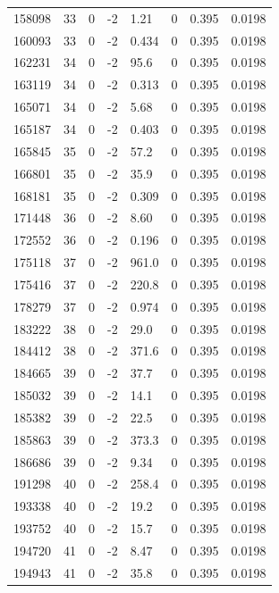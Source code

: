 \documentclass[preview]{standalone}
\begin{document}
{{{{{{{{\begin{tabular}{L{1.2cm}C{1.2cm} C{0.3cm}C{0.5cm} C{1.4cm}C{1.4cm} C{1.4cm}C{1.4cm}}
  158098  &    33  & 0     & -2 &  1.21  & 0  & 0.395 &  0.0198   \\ 
  160093  &    33  & 0     & -2 &  0.434  & 0  & 0.395 &  0.0198   \\ 
  162231  &    34  & 0     & -2 &  95.6  & 0  & 0.395 &  0.0198   \\ 
  163119  &    34  & 0     & -2 &  0.313  & 0  & 0.395 &  0.0198   \\ 
  165071  &    34  & 0     & -2 &  5.68  & 0  & 0.395 &  0.0198   \\ 
  165187  &    34  & 0     & -2 &  0.403  & 0  & 0.395 &  0.0198   \\ 
  165845  &    35  & 0     & -2 &  57.2  & 0  & 0.395 &  0.0198   \\ 
  166801  &    35  & 0     & -2 &  35.9  & 0  & 0.395 &  0.0198   \\ 
  168181  &    35  & 0     & -2 &  0.309  & 0  & 0.395 &  0.0198   \\ 
  171448  &    36  & 0     & -2 &  8.60  & 0  & 0.395 &  0.0198   \\ 
  172552  &    36  & 0     & -2 &  0.196  & 0  & 0.395 &  0.0198   \\ 
  175118  &    37  & 0     & -2 &  961.0  & 0  & 0.395 &  0.0198   \\ 
  175416  &    37  & 0     & -2 &  220.8  & 0  & 0.395 &  0.0198   \\ 
  178279  &    37  & 0     & -2 &  0.974  & 0  & 0.395 &  0.0198   \\ 
  183222  &    38  & 0     & -2 &  29.0  & 0  & 0.395 &  0.0198   \\ 
  184412  &    38  & 0     & -2 &  371.6  & 0  & 0.395 &  0.0198   \\ 
  184665  &    39  & 0     & -2 &  37.7  & 0  & 0.395 &  0.0198   \\ 
  185032  &    39  & 0     & -2 &  14.1  & 0  & 0.395 &  0.0198   \\ 
  185382  &    39  & 0     & -2 &  22.5  & 0  & 0.395 &  0.0198   \\ 
  185863  &    39  & 0     & -2 &  373.3  & 0  & 0.395 &  0.0198   \\ 
  186686  &    39  & 0     & -2 &  9.34  & 0  & 0.395 &  0.0198   \\ 
  191298  &    40  & 0     & -2 &  258.4  & 0  & 0.395 &  0.0198   \\ 
  193338  &    40  & 0     & -2 &  19.2  & 0  & 0.395 &  0.0198   \\ 
  193752  &    40  & 0     & -2 &  15.7  & 0  & 0.395 &  0.0198   \\ 
  194720  &    41  & 0     & -2 &  8.47  & 0  & 0.395 &  0.0198   \\ 
  194943  &    41  & 0     & -2 &  35.8  & 0  & 0.395 &  0.0198   \\ 
\hline 
\end{tabular} 

}}}}}}}}
\end{document}

